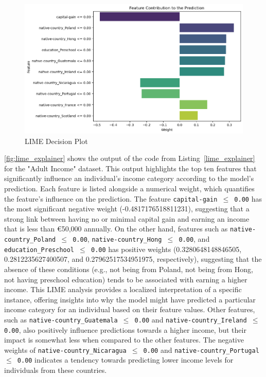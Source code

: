 \documentclass[10pt,journal,compsoc]{IEEEtran}
\begin{document}
\begin{figure}[H]
    \centering
    \includegraphics[width=1\linewidth]{images/lime_summary_plot.png}
    \caption{LIME Decision Plot}
    \label{fig:lime_explainer}
\end{figure}

\autoref{fig:lime_explainer} shows the output of the code from Listing~\ref{lime_explainer} for the "Adult Income" dataset. This output highlights the top ten features that significantly influence an individual's income category according to the model's prediction.
Each feature is listed alongside a numerical weight, which quantifies the feature's influence on the prediction. 
The feature \texttt{capital-gain $\leq$ 0.00} has the most significant negative weight (-0.4817176518811231), suggesting that a strong link between having no or minimal capital gain and earning an income that is less than €50,000 annually. On the other hand, features such as \texttt{native-country\_Poland $\leq$ 0.00}, \texttt{native-country\_Hong $\leq$ 0.00}, and \texttt{education\_Preschool $\leq$ 0.00} has positive weights 
(0.3280648148846505, 0.2812235627400507, and 0.27962517534951975, respectively), suggesting that the absence of these conditions (e.g., not being from Poland, not being from Hong, not having preschool education) tends to be associated with earning a higher income. This LIME analysis provides a localized interpretation of a specific instance, offering insights into why the model might have predicted a particular income category for an individual based on their feature values. 
Other features, such as \texttt{native-country\_Guatemala $\leq$ 0.00} and \texttt{native-country\_Ireland $\leq$ 0.00}, also positively influence predictions towards a higher income, but their impact is somewhat less when compared to the other features. The negative weights of \texttt{native-country\_Nicaragua $\leq$ 0.00} 
and \texttt{native-country\_Portugal $\leq$ 0.00} indicates a tendency towards predicting lower income levels for individuals from these countries.
\end{document}
